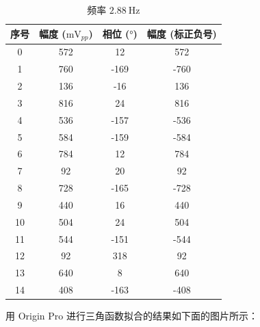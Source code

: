 \documentclass{customDoc}
\begin{document}
\parbox{0.6\textwidth}{
\begin{longtable}{|c|c|c|c|}
  \caption{频率 $\SI{2.88}{\hertz}$} \\
    \hline
    序号    & 幅度 ($\si{\milli\volt}_{pp}$) & 相位 ($\si{\degree}$) & 幅度 (标正负号) \\
    \hline
    0     & 572   & 12    & 572 \\
    \hline
    1     & 760   & -169  & -760 \\
    \hline
    2     & 136   & -16   & 136 \\
    \hline
    3     & 816   & 24    & 816 \\
    \hline
    4     & 536   & -157  & -536 \\
    \hline
    5     & 584   & -159  & -584 \\
    \hline
    6     & 784   & 12    & 784 \\
    \hline
    7     & 92    & 20    & 92 \\
    \hline
    8     & 728   & -165  & -728 \\
    \hline
    9     & 440   & 16    & 440 \\
    \hline
    10    & 504   & 24    & 504 \\
    \hline
    11    & 544   & -151  & -544 \\
    \hline
    12    & 92    & 318   & 92 \\
    \hline
    13    & 640   & 8     & 640 \\
    \hline
    14    & 408   & -163  & -408 \\
    \hline
\end{longtable}
}

用 Origin Pro 进行三角函数拟合的结果如下面的图片所示：
\end{document}
